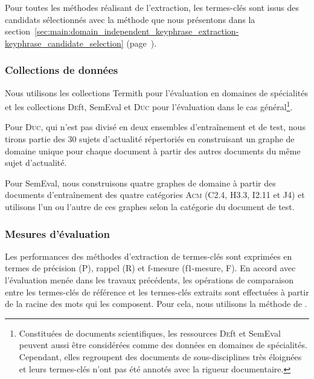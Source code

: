         Pour toutes les méthodes réalisant de l'extraction, les termes-clés sont
        issus des candidats sélectionnés avec la méthode que nous présentons
        dans la
        section~\ref{sec:main:domain_independent_keyphrase_extraction-keyphrase_candidate_selection}
        (page~\pageref{sec:main:domain_independent_keyphrase_extraction-keyphrase_candidate_selection}).

      \subsubsection{Collections de données}
      \label{subsubsec:main-domain_specific_keyphrase_annotation-supervised_automatic_keyphrase_annotation-evaluation-evaluation_data}
        Nous utilisons les collections Termith pour l'évaluation en domaines de
        spécialités et les collections \textsc{De}ft, SemEval et \textsc{Duc}
        pour l'évaluation dans le cas général\footnote{Constituées de documents
        scientifiques, les ressources \textsc{De}ft et SemEval peuvent aussi
        être considérées comme des données en domaines de spécialités.
        Cependant, elles regroupent des documents de sous-disciplines très
        éloignées et leurs termes-clés n'ont pas été annotés avec la rigueur
        documentaire.}.
        
        Pour \textsc{Duc}, qui n'est pas divisé en deux ensembles d'entraînement
        et de test, nous tirons partie des 30 sujets d'actualité répertoriés en
        construisant un graphe \og{}de domaine\fg{} unique pour chaque document
        à partir des autres documents du même sujet d'actualité.
        
        Pour SemEval, nous construisons quatre graphes de domaine à partir des
        documents d'entraînement des quatre catégories \textsc{Acm} (C2.4, H3.3,
        I2.11 et J4) et utilisons l'un ou l'autre de ces graphes selon la
        catégorie du document de test. 
      
      \subsubsection{Mesures d'évaluation}
      \label{subsubsec:main-domain_specific_keyphrase_annotation-supervised_automatic_keyphrase_annotation-evaluation-evaluation_measures}
        Les performances des méthodes d'extraction de termes-clés sont exprimées
        en termes de précision (P), rappel (R) et f-mesure (f1-mesure, F). En
        accord avec l'évaluation menée dans les travaux précédents, les
        opérations de comparaison entre les termes-clés de référence et les
        termes-clés extraits sont effectuées à partir de la racine des mots qui
        les composent. Pour cela, nous utilisons la méthode de
        .

